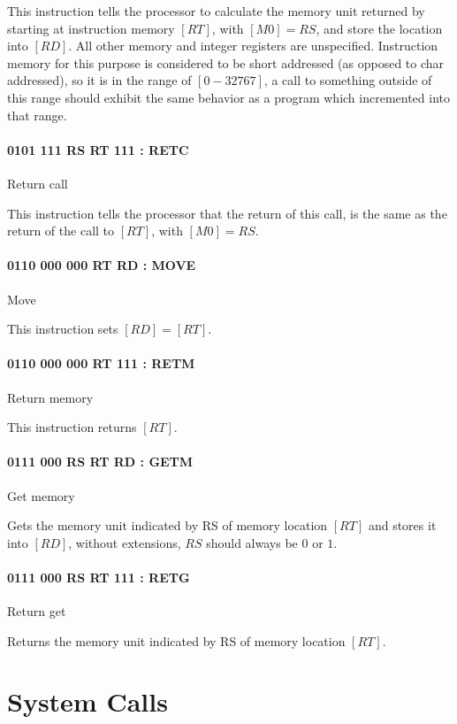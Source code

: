 \documentclass[12pt,letterpaper]{report}
\newcommand{\reg}[1]{\left[#1\right]}
\begin{document}
This instruction tells the processor to calculate the memory unit returned by starting at instruction memory $\reg{RT}$, with $\reg{M0} = RS$, and store the location into $\reg{RD}$. All other memory and integer registers are unspecified. Instruction memory for this purpose is considered to be short addressed (as opposed to char addressed), so it is in the range of $[0-32767]$, a call to something outside of this range should exhibit the same behavior as a program which incremented into that range.
\subsubsection{0101 111  RS  RT 111 : RETC}
\label{instruction:RETC}
Return call

This instruction tells the processor that the return of this call, is the same as the return of the call to $\reg{RT}$, with $\reg{M0} = RS$.
\subsubsection{0110 000 000  RT  RD : MOVE}
Move

This instruction sets $\reg{RD} = \reg{RT}$.
\subsubsection{0110 000 000  RT 111 : RETM}
\label{instruction:RETM}
Return memory

This instruction returns $\reg{RT}$.
\subsubsection{0111 000 RS  RT  RD : GETM}
\label{instruction:GETM}
Get memory

Gets the memory unit indicated by RS of memory location $\reg{RT}$ and stores it into $\reg{RD}$, without extensions, $RS$ should always be $0$ or $1$.
\subsubsection{0111 000 RS  RT 111 : RETG}
\label{instruction:RETG}
Return get

Returns the memory unit indicated by RS of memory location $\reg{RT}$.
\chapter{System Calls}
\label{label:System Calls}
\end{document}
